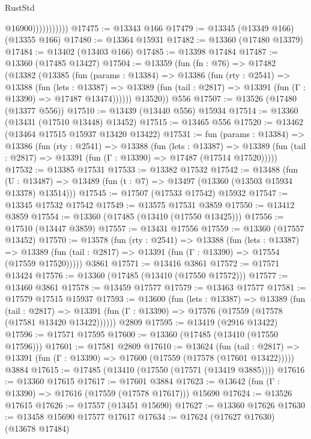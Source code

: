 \begin{lexlean}{RustStd}
\begin{coremodule}
                          @16900)))))))))))
@17475 := @13343 @166
@17479 := @13345 (@13349 @166) (@13355 @166)
@17480 := @13364 @15931
@17482 := @13360 (@17480 @13379)
@17484 := @13402 (@13403 @166)
@17485 := @13398 @17484
@17487 := @13360 (@17485 @13427)
@17504 := @13359
    (fun (fn : @76) =>
    @17482
      (@13382
        (@13385
          (fun (params : @13384) =>
          @13386
            (fun (rty : @2541) =>
            @13388
              (fun (lets : @13387) =>
              @13389 (fun (tail : @2817) => @13391 (fun (Γ : @13390) => @17487 @13474))))))
        @13520))
    @556
@17507 := @13526 (@17480 (@13377 @556))
@17510 := @13439 (@13440 @556) @15934
@17514 := @13360 (@13431 (@17510 @13448) @13452)
@17515 := @13465 @556
@17520 := @13462 (@13464 @17515 @15937 @13420 @13422)
@17531 := fun (params : @13384) =>
  @13386
    (fun (rty : @2541) =>
    @13388
      (fun (lets : @13387) =>
      @13389 (fun (tail : @2817) => @13391 (fun (Γ : @13390) => @17487 (@17514 @17520)))))
@17532 := @13385 @17531
@17533 := @13382 @17532
@17542 := @13488
    (fun (U : @13487) => @13489 (fun (t : @7) => @13497 (@13360 (@13503 @15934 @13378) @13514)))
@17545 := @17507 (@17533 @17542) @15932
@17547 := @13345 @17532 @17542
@17549 := @13575 @17531 @3859
@17550 := @13412 @3859
@17554 := @13360 (@17485 (@13410 (@17550 @13425)))
@17556 := @17510 (@13447 @3859)
@17557 := @13431 @17556
@17559 := @13360 (@17557 @13452)
@17570 := @13578
    (fun (rty : @2541) =>
    @13388
      (fun (lets : @13387) =>
      @13389 (fun (tail : @2817) => @13391 (fun (Γ : @13390) => @17554 (@17559 @17520)))))
    @3861
@17571 := @13416 @3861
@17572 := @17571 @13424
@17576 := @13360 (@17485 (@13410 (@17550 @17572)))
@17577 := @13460 @3861
@17578 := @13459 @17577
@17579 := @13463 @17577
@17581 := @17579 @17515 @15937
@17593 := @13600
    (fun (lets : @13387) =>
    @13389
      (fun (tail : @2817) =>
      @13391 (fun (Γ : @13390) => @17576 (@17559 (@17578 (@17581 @13420 @13422))))))
    @2809
@17595 := @13419 (@2916 @13422)
@17596 := @17571 @17595
@17600 := @13360 (@17485 (@13410 (@17550 @17596)))
@17601 := @17581 @2809
@17610 := @13624
    (fun (tail : @2817) => @13391 (fun (Γ : @13390) => @17600 (@17559 (@17578 (@17601 @13422)))))
    @3884
@17615 := @17485 (@13410 (@17550 (@17571 (@13419 @3885))))
@17616 := @13360 @17615
@17617 := @17601 @3884
@17623 := @13642 (fun (Γ : @13390) => @17616 (@17559 (@17578 @17617))) @15690
@17624 := @13526 @17615
@17626 := @17557 (@13451 @15690)
@17627 := @13360 @17626
@17630 := @13458 @15690 @17577 @17617
@17634 := @17624 (@17627 @17630) (@13678 @17484)

\end{coremodule}
\end{lexlean}

